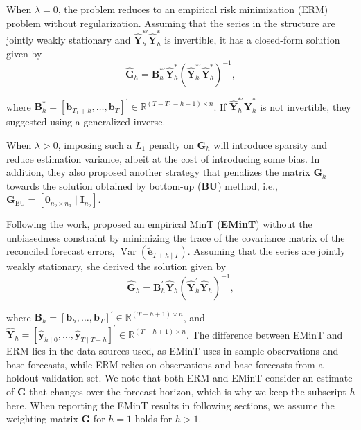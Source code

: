 \documentclass[11pt,a4paper,]{article}
\begin{document}
When \(\lambda = 0\), the problem reduces to an empirical risk
minimization (ERM) problem without regularization. Assuming that the
series in the structure are jointly weakly stationary and
\(\hat{\boldsymbol{Y}}_{h}^{*\prime}\hat{\boldsymbol{Y}}_{h}^{*}\) is
invertible, it has a closed-form solution given by \[
\hat{\boldsymbol{G}}_h = \boldsymbol{B}_{h}^{*\prime}\hat{\boldsymbol{Y}}_{h}^{*}\left(\hat{\boldsymbol{Y}}_{h}^{*\prime}\hat{\boldsymbol{Y}}_{h}^{*}\right)^{-1},
\]

where
\(\boldsymbol{B}_{h}^{*}=\left[\boldsymbol{b}_{T_1+h}, \ldots, \boldsymbol{b}_T\right]^{\prime} \in \mathbb{R}^{\left(T-T_1-h+1\right) \times n}\).
If \(\hat{\boldsymbol{Y}}_{h}^{*\prime}\hat{\boldsymbol{Y}}_{h}^{*}\) is
not invertible, they suggested using a generalized inverse.

When \(\lambda > 0\), imposing such a \(L_1\) penalty on
\(\boldsymbol{G}_h\) will introduce sparsity and reduce estimation
variance, albeit at the cost of introducing some bias. In addition, they
also proposed another strategy that penalizes the matrix
\(\boldsymbol{G}_h\) towards the solution obtained by bottom-up
(\textbf{BU}) method, i.e.,
\(\boldsymbol{G}_{\text{BU}} = \left[\boldsymbol{0}_{n_b \times n_a} \mid \boldsymbol{I}_{n_b}\right]\).

Following the work, \textcite{Wickramasuriya2021-am} proposed an
empirical MinT (\textbf{EMinT}) without the unbiasedness constraint by
minimizing the trace of the covariance matrix of the reconciled forecast
errors, \(\operatorname{Var}(\tilde{\boldsymbol{e}}_{T+h \mid T})\).
Assuming that the series are jointly weakly stationary, she derived the
solution given by \[
\hat{\boldsymbol{G}}_{h} = \boldsymbol{B}_{h}^{\prime}\hat{\boldsymbol{Y}}_{h}\left(\hat{\boldsymbol{Y}}_{h}^{\prime}\hat{\boldsymbol{Y}}_{h}\right)^{-1},
\]

where
\(\boldsymbol{B}_{h}=\left[\boldsymbol{b}_{h}, \ldots, \boldsymbol{b}_T\right]^{\prime} \in \mathbb{R}^{\left(T-h+1\right) \times n}\),
and
\(\hat{\boldsymbol{Y}}_{h}=\left[\hat{\boldsymbol{y}}_{h \mid 0}, \ldots, \hat{\boldsymbol{y}}_{T \mid T-h}\right]^{\prime} \in \mathbb{R}^{\left(T-h+1\right) \times n}\).
The difference between EMinT and ERM lies in the data sources used, as
EMinT uses in-sample observations and base forecasts, while ERM relies
on observations and base forecasts from a holdout validation set. We
note that both ERM and EMinT consider an estimate of \(\boldsymbol{G}\)
that changes over the forecast horizon, which is why we keep the
subscript \(h\) here. When reporting the EMinT results in following
sections, we assume the weighting matrix \(\boldsymbol{G}\) for \(h=1\)
holds for \(h>1\).
\end{document}

